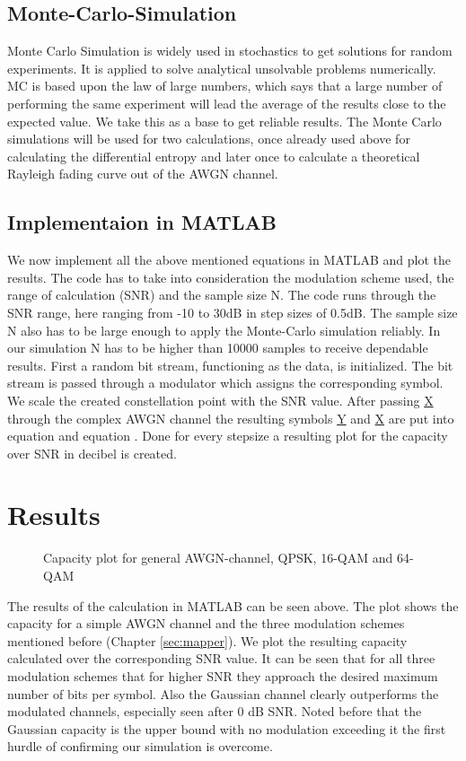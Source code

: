 \subsection{Monte-Carlo-Simulation}
\label{sec:MCS}
Monte Carlo Simulation is widely used in stochastics to get solutions for random experiments. It is applied to solve analytical unsolvable problems numerically. MC is based upon the law of large numbers, which says that a large number of performing the same experiment will lead the average of the results close to the expected value. We take this as a base to get reliable results. The Monte Carlo simulations will be used for two calculations, once already used above for calculating the differential entropy and later once to calculate a theoretical Rayleigh fading curve out of the AWGN channel. 

\subsection{Implementaion in MATLAB}
\label{AWGNMAT}
We now implement all the above mentioned equations in MATLAB and plot the results. The code has to take into consideration the modulation scheme used, the range of calculation (SNR) and the sample size N. The code runs through the SNR range, here ranging from -10 to 30dB in step sizes of 0.5dB. The sample size N also has to be large enough to apply the Monte-Carlo simulation reliably. In our simulation N has to be higher than 10000 samples to receive dependable results. First a random bit stream, functioning as the data, is initialized. The bit stream is passed through a modulator which assigns the corresponding symbol. We scale the created constellation point with the SNR value. After passing \underline{X} through the complex AWGN channel the resulting symbols \underline{Y} and \underline{X} are put into equation  and equation . Done for every stepsize a resulting plot for the capacity over SNR in decibel is created.  
    

\section{Results}
\begin{figure}[!htb]
		\setlength{}
	\setlength\fheight{0.4\textheight}
	\centering
	
	\caption{Capacity plot for general AWGN-channel, QPSK, 16-QAM and 64-QAM}
	\label{fig:capmod}
\end{figure}
The results of the calculation in MATLAB can be seen above. The plot shows the capacity for a simple AWGN channel and the three modulation schemes mentioned before (Chapter \eqref{sec:mapper}). We plot the resulting capacity calculated over the corresponding SNR value. 
It can be seen that for all three modulation schemes that for higher \gls{SNR} they approach the desired maximum number of bits per symbol.
Also the Gaussian channel clearly outperforms the modulated channels, especially seen after 0 dB SNR. Noted before that the Gaussian capacity is the upper bound with no modulation exceeding it the first hurdle of confirming our simulation is overcome.


\clearpage